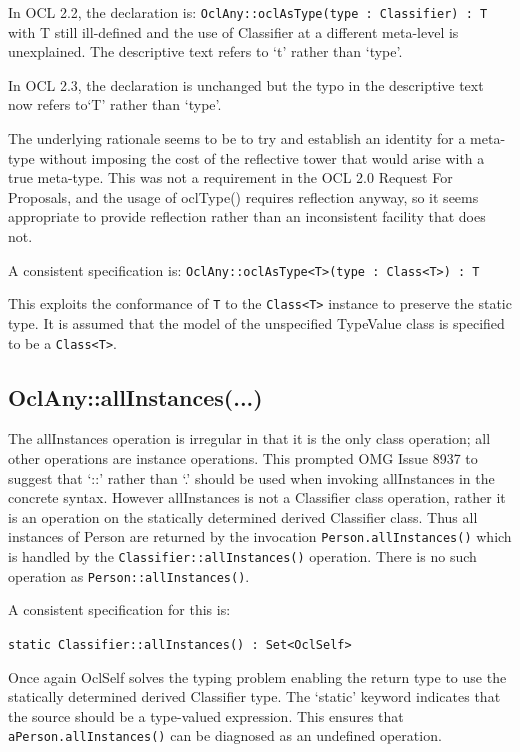 \documentclass{eceasst}
\begin{document}
In OCL 2.2, the declaration is: \verb!OclAny::oclAsType(type : Classifier) : T! with T still ill-defined and the use of Classifier at a different meta-level is unexplained. The descriptive text refers to `t' rather than `type'.

In OCL 2.3, the declaration is unchanged but the typo in the descriptive text now refers to`T' rather than `type'.

The underlying rationale seems to be to try and establish an identity for a meta-type without imposing the cost of the reflective tower that would arise with a true meta-type. This was not a requirement in the OCL 2.0 Request For Proposals\cite{OCL-RFP}, and the usage of oclType() requires reflection anyway, so it seems appropriate to provide reflection rather than an inconsistent facility that does not.

A consistent specification is: \verb!OclAny::oclAsType<T>(type : Class<T>) : T!

This exploits the conformance of \verb!T! to the \verb!Class<T>! instance to preserve the static type. It is assumed that the model of the unspecified TypeValue class is specified to be a \verb!Class<T>!. 

\subsection{OclAny::allInstances(...)}

The allInstances operation is irregular in that it is the only class operation; all other operations are instance operations. This prompted OMG Issue 8937\cite{OMG-Issue-8937} to suggest that `::' rather than `.' should be used when invoking allInstances in the concrete syntax. However allInstances is not a Classifier class operation, rather it is an operation on the statically determined derived Classifier class. Thus all instances of Person are returned by the invocation  \verb!Person.allInstances()! which is handled by the  \verb!Classifier::allInstances()! operation. There is no such operation as \verb!Person::allInstances()!. 

A consistent specification for this is:

\verb!static Classifier::allInstances() : Set<OclSelf>!

Once again OclSelf solves the typing problem enabling the return type to use the statically determined derived Classifier type. The `static' keyword indicates that the source should be a type-valued expression. This ensures that  \verb!aPerson.allInstances()! can be diagnosed as an undefined operation.
\end{document}
